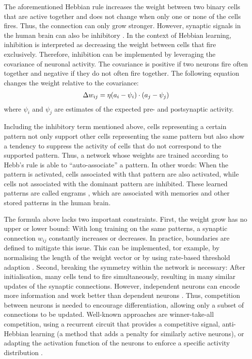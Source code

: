 The aforementioned Hebbian rule increases the weight between two binary cells that are active together and does not change when only one or none of the cells fires. Thus, the connection can only grow stronger.
However, synaptic signals in the human brain can also be inhibitory \cite{coombs_specific_1955}.
In the context of Hebbian learning, inhibition is interpreted as decreasing the weight between cells that fire exclusively.
Therefore, inhibition can be implemented by leveraging the covariance of neuronal activity.
The covariance is positive if two neurons fire often together and negative if they do not often fire together.
The following equation changes the weight relative to the covariance:
%
\begin{align}\eqlbl{hebb_2}
	\Delta w_{ij} = \eta (a_i - \psi_i) \cdot (a_j - \psi_j)
\end{align}
%
where \(\psi_i\) and \(\psi_j\) are estimates of the expected pre- and postsynaptic activity.

Including the inhibitory term mentioned above, cells representing a certain pattern not only support other cells representing the same pattern but also show a tendency to suppress the activity of cells that do not correspond to the supported pattern. Thus, a network whose weights are trained according to Hebb's rule is able to ``auto-associate'' a pattern. In other words: When the pattern is activated, cells associated with that pattern are also activated, while cells not associated with the dominant pattern are inhibited. These learned patterns are called engrams , which are associated with memories and other stored patterns in the human brain.

The formula above lacks two important constraints.
First, the weight grow has no upper or lower bound: With long training on the same patterns, a synaptic connection $w_{ij}$ constantly increases or decreases. In practice, boundaries are defined to mitigate this issue. This can be implemented, tor example,  by normalising the length of the weight vector  or by using rate-based threshold adaption .
Second, breaking the symmetry within the network is necessary: After initialisation, many cells tend to fire simultaneously, resulting in many similar updates of the synaptic connections. However, independent neurons can encode more information and work better than dependent neurons .
Thus, competition between neurons is needed to encourage differentiation, allowing only a subset of connections to be updated.
Well-known approaches are winner-take-all competition, using a recurrent circuit that provides a competitive signal, anti-Hebbian learning  (a method that adds a penalty for similarly active neurons), or adapting the activation function of the neurons to enforce a specific activity distribution .



